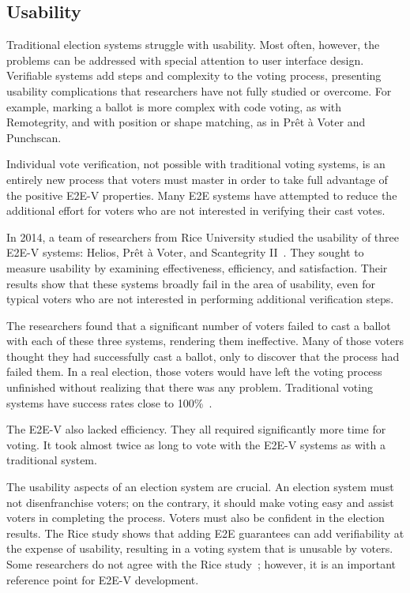 \subsection{Usability}

Traditional election systems struggle with usability. Most often,
however, the problems can be addressed with special attention to user
interface design. Verifiable systems add steps and complexity to the
voting process, presenting usability complications that researchers
have not fully studied or overcome. For example, marking a ballot is
more complex with code voting, as with Remotegrity, and with position
or shape matching, as in Prêt à Voter and Punchscan. 

Individual vote verification, not possible with traditional voting
systems, is an entirely new process that voters must master in order
to take full advantage of the positive E2E-V properties. Many E2E
systems have attempted to reduce the additional effort for voters who
are not interested in verifying their cast votes.

In 2014, a team of researchers from Rice University studied the
usability of three E2E-V systems: Helios, Prêt à Voter, and
Scantegrity II~\cite{acemyan2014usability}. They sought to measure
usability by examining effectiveness, efficiency, and
satisfaction. Their results show that these systems broadly fail in
the area of usability, even for typical voters who are not interested
in performing additional verification steps.

The researchers found that a significant number of voters failed to
cast a ballot with each of these three systems, rendering them
ineffective. Many of those voters thought they had successfully cast a
ballot, only to discover that the process had failed them. In a real
election, those voters would have left the voting process unfinished
without realizing that there was any problem. Traditional voting
systems have success rates close to 100\%~\cite{byrne2007usability}.

The E2E-V also lacked efficiency. They all required significantly more
time for voting. It took almost twice as long to vote with the E2E-V
systems as with a traditional system.

The usability aspects of an election system are crucial. An election
system must not disenfranchise voters; on the contrary, it should
make voting easy and assist voters in completing the process. Voters
must also be confident in the election results. The Rice study
shows that adding E2E guarantees can add verifiability at the expense
of usability, resulting in a voting system that is unusable by
voters. Some researchers do not agree with the Rice
study~\cite{mcburnett2014}; however, it is an important reference
point for E2E-V development. 

